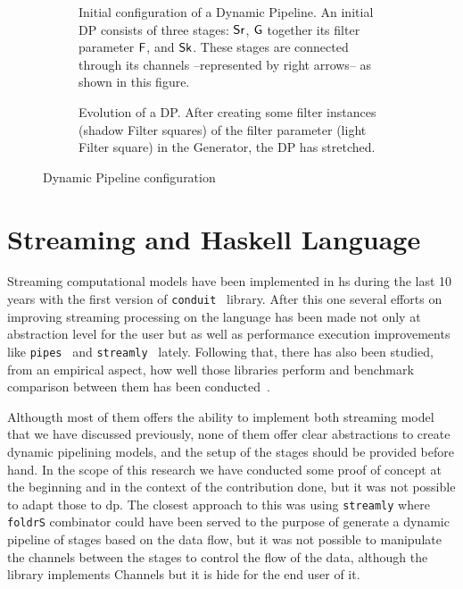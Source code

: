 \begin{figure}[h]
  \begin{subfigure}[b]{0.5\textwidth}
   \centering  
{}
\caption{Initial configuration of a Dynamic Pipeline.  An initial DP consists of three stages: $\mathsf{Sr}$, $\mathsf{G}$ together its filter parameter $\mathsf{F}$, and $\mathsf{Sk}$. These stages are connected through its channels --represented by right arrows-- as shown in this figure.}
\label{fig:initialDP}
\end{subfigure}
\hspace{0.3cm}
\begin{subfigure}[b]{0.5\textwidth}
 \centering
 \caption{Evolution of a DP. After creating some filter instances (shadow Filter squares) of the filter parameter (light Filter square) in the Generator, the DP has stretched.}
\label{fig:activeDP}
\end{subfigure}
\caption{Dynamic Pipeline configuration}
\end{figure}


\section{Streaming and Haskell Language}
Streaming computational models have been implemented in \acrfull{hs} during the last 10 years with the first version of \texttt{conduit}~\cite{conduit} library.
After this one several efforts on improving streaming processing on the language has been made not only at abstraction level for the user but as well as performance execution 
improvements like \texttt{pipes}~\cite{pipes} and \texttt{streamly}~\cite{streamly} lately.
Following that, there has also been studied, from an empirical aspect, how well those libraries perform and benchmark comparison between them has been conducted~\cite{benchstreamhs}.

Althougth most of them offers the ability to implement both streaming model that we have discussed previously, none of them offer clear abstractions to create dynamic pipelining models, and
the setup of the stages should be provided before hand. In the scope of this research we have conducted some proof of concept at the beginning and in the context of the contribution done, 
but it was not possible to adapt those to \acrshort{dp}. The closest approach to this was using \texttt{streamly} where \texttt{foldrS} combinator
could have been served to the purpose of generate a dynamic pipeline of stages based on the data flow, but it was not possible to manipulate the channels between the stages to control the flow 
of the data, although the library implements Channels but it is hide for the end user of it.

